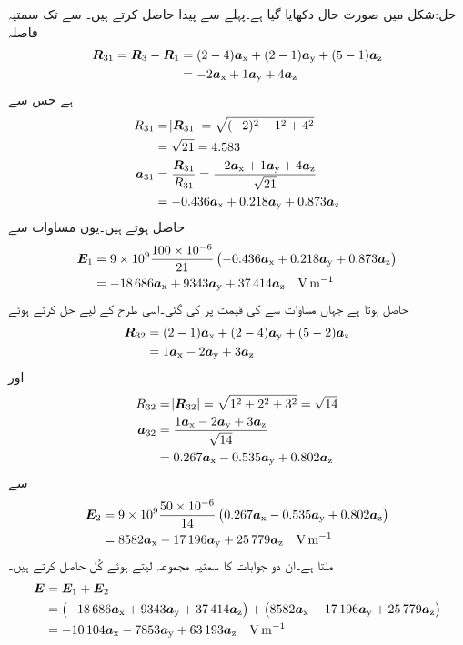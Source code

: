 حل:شکل  میں صورت حال دکھایا گیا ہے۔پہلے  سے پیدا  حاصل کرتے ہیں۔  سے  تک سمتیہ فاصلہ
\begin{align*}
\kvecsub{R}{31}=\kvecsub{R}{3}-\kvecsub{R}{1}&=(2-4)\ax+(2-1)\ay+(5-1)\az\\
&=-2\ax+1\ay+4\az
\end{align*}
ہے جس سے
\begin{align*}
R_{31}&=\abs{\kvecsub{R}{31}}=\sqrt{(-2)^2+1^2+4^2}\\
&=\sqrt{21}=4.583\\
\kvecsub{a}{31}&=\frac{\kvecsub{R}{31}}{R_{31}}=\frac{-2\ax+1\ay+4\az}{\sqrt{21}}\\
&=-0.436\ax+0.218\ay+0.873\az
\end{align*}
حاصل ہوتے ہیں۔یوں مساوات  سے
\begin{align*}
\kvecsub{E}{1}&=9 \times 10^9 \frac{100 \times 10^{-6}}{21} \left(-0.436\ax+0.218\ay+0.873\az\right)\\
&=-\num{18686}\ax+\num{9343}\ay+\num{37414}\az \quad \si{\volt \per \meter}
\end{align*}
حاصل ہوتا ہے جہاں مساوات  سے  کی قیمت  پر کی گئی۔اسی طرح  کے لیے حل کرتے ہوئے
\begin{align*}
\kvecsub{R}{32}&=(2-1)\ax+(2-4)\ay+(5-2)\az\\
&=1\ax-2\ay+3\az
\end{align*}
اور
\begin{align*}
R_{32}&=\abs{\kvecsub{R}{32}}=\sqrt{1^2+2^2+3^2}=\sqrt{14}\\
\kvecsub{a}{32}&=\frac{1\ax-2\ay+3\az}{\sqrt{14}}\\
&=0.267\ax-0.535\ay+0.802\az
\end{align*}
سے
\begin{align*}
\kvecsub{E}{2}&=9 \times 10^9 \frac{50 \times 10^{-6}}{14} \left(0.267\ax-0.535\ay+0.802\az \right)\\
&=\num{8582}\ax-\num{17196}\ay+\num{25779}\az \quad \si{\volt \per \meter}
\end{align*}
ملتا ہے۔ان دو جوابات کا سمتیہ مجموعہ لیتے ہوئے کُل  حاصل کرتے ہیں۔
\begin{align*}
\kvec{E}&=\kvecsub{E}{1}+\kvecsub{E}{2}\\
&=\left(\num{-18686} \ax+\num{9343} \ay+\num{37414}\az\right)+\left(\num{8582}\ax-\num{17196}\ay+\num{25779}\az\right)\\
&=-\num{10104}\ax-\num{7853}\ay+\num{63193}\az \quad \si{\volt \per \meter}
\end{align*} 
 
